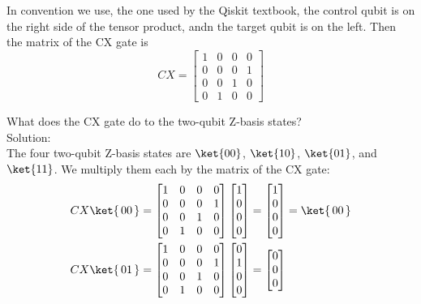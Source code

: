 \documentclass{article}
\newcommand{\soln}{{\\[1em] \hspace{-1em}\color{greentitle}\sffamily\large Solution: \\[0.5em]}}
\theoremstyle{definition}
\newcommand{\kz}[1]{\ket{\,#1\,}}
\begin{document}
In convention we use, the one used by the Qiskit textbook, the control qubit is on the right side of the tensor product, andn the target qubit is on the left.  Then the matrix of the CX gate is
\begin{equation}
	CX = \begin{bmatrix}
		1 & 0 & 0 & 0\\
		0 & 0 & 0 & 1\\
		0 & 0 & 1 & 0\\
		0 & 1 & 0 & 0
	\end{bmatrix}
\end{equation}
\begin{example}
	What does the CX gate do to the two-qubit Z-basis states?
	\soln \textnormal{The four two-qubit Z-basis states are $\ket{00}$, $\ket{10}$, $\ket{01}$, and $\ket{11}$.  We multiply them each by the matrix of the CX gate:}
	\begin{align}
		CX \kz{00} &= \begin{bmatrix}
			1 & 0 & 0 & 0\\
			0 & 0 & 0 & 1\\
			0 & 0 & 1 & 0\\
			0 & 1 & 0 & 0
		\end{bmatrix} \begin{bmatrix}
			1\\
			0\\
			0\\
			0
		\end{bmatrix} = \begin{bmatrix}
			1\\
			0\\
			0\\
			0
		\end{bmatrix} = \kz{00}\\
		CX \kz{01} &= \begin{bmatrix}
			1 & 0 & 0 & 0\\
			0 & 0 & 0 & 1\\
			0 & 0 & 1 & 0\\
			0 & 1 & 0 & 0
		\end{bmatrix} \begin{bmatrix}
			0\\
			1\\
			0\\
			0
		\end{bmatrix} = \begin{bmatrix}
			0\\
			0\\
			0\\

\end{bmatrix}
\end{align}
\end{example}
\end{document}
